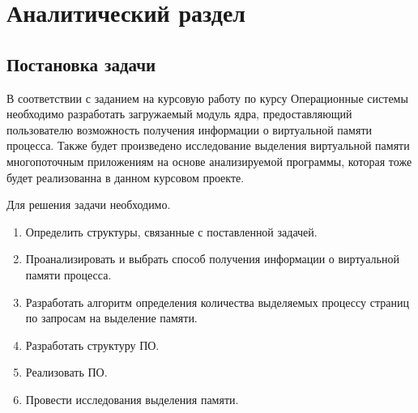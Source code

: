 
\chapter{Аналитический раздел}
\label{cha:analysis}

\section{Постановка задачи}

В соответствии с заданием на курсовую работу по курсу 
Операционные системы необходимо разработать загружаемый модуль ядра, предоставляющий пользователю 
возможность получения информации о виртуальной памяти процесса.
Также будет произведено исследование выделения виртуальной памяти
многопоточным приложениям на основе анализируемой программы, которая тоже будет реализованна
в данном курсовом проекте.%

Для решения задачи необходимо.

\begin{enumerate}
	\item Определить структуры, связанные с поставленной задачей.
	\item Проанализировать и выбрать способ получения информации о виртуальной памяти процесса.
	\item Разработать алгоритм определения количества выделяемых процессу страниц по запросам на выделение памяти.
	\item Разработать структуру ПО.
	\item Реализовать ПО.
	\item Провести исследования выделения памяти.


\end{enumerate}


